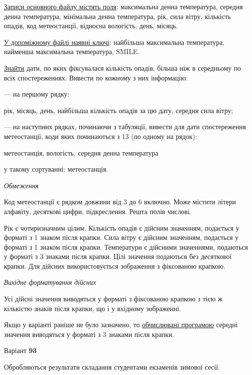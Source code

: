 \documentclass[11pt, ukrainian]{article}
\begin{document}
\underline{Записи основного файлу містять поля}: максимальна денна температура, середня денна температура, мінімальна денна температура, рік, сила вітру, кількість опадів, код метеостанції, відносна вологість, день, місяць.

\underline{У допоміжному файлі наявні ключі}: найбільша максимальна температура, найменша максимальна температура, SMILE.

\underline{Знайти} дати, по яких фіксувалася кількість опадів, більша ніж в середньому по всіх спостереженнях. Вивести по кожному з них інформацію:\par
{\noindent}--- на першому рядку:\par
рік, місяць, день, найбільша кількість опадів за цю дату, середня сила вітру;

{\noindent}--- на наступних рядках, починаючи з табуляції, вивести для дати спостереження метеостанції, коди яких починаються з 13 (по одному на рядок):\par
метеостанція, вологість, середня денна температура

{\noindent}у такому сортуванні: метеостанція.


\bigskip\textit{Обмеження}

Код метеостанції є рядком довжини від 3 до 6 включно.
Може містити літери алфавіту, десяткові цифри, підкреслення. Решта полів числові.

Рік є чотиризначним цілим.
Кількість опадів є дійсним значенням, подається у форматі з 1 знаком після крапки.
Сила вітру є дійсним значенням, подається у форматі з 1 знаком після крапки.
Температури є дійсними значеннями, подаються у форматі з 3 знаками після крапки.
Цілі значення подаються без десяткової крапки.
Для дійсних використовується зображення з фіксованою крапкою.

\textit{Вихідне форматування дійсних}

Усі дійсні значення виводяться у форматі з фіксованою крапкою з тією ж кількістю знаків після крапки, що і у вхідному зображенні.

Якщо у варіанті раніше не було зазначено, то \underline{обчислювані програмою} середні значення виводяться у форматі з 3 знаками після крапки.




\par
\newpage
{\center Варіант  \No \textbf { 93 }\par}
\bigskip
Обробляються результати складання студентами екзаменів зимової сесії.
\end{document}
